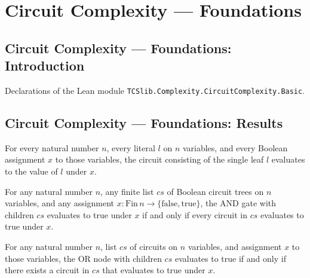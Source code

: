 \section{Circuit Complexity --- Foundations}
\subsection*{Circuit Complexity --- Foundations: Introduction}

Declarations of the Lean module \texttt{TCSlib.Complexity.CircuitComplexity.Basic}.

\subsection*{Circuit Complexity --- Foundations: Results}

\begin{theorem}
\label{BoolCircuit.TreeCircuit.eval_lit}
\leanok
{}
For every natural number $n$, every literal $l$ on $n$ variables, and every Boolean
assignment $x$ to those variables, the circuit consisting of the single leaf $l$
evaluates to the value of $l$ under $x$.
\end{theorem}

\begin{theorem}
\label{BoolCircuit.TreeCircuit.eval_node_true_iff}
\leanok
{}
For any natural number $n$, any finite list $cs$ of Boolean circuit trees on $n$
variables, and any assignment $x : \mathrm{Fin}\,n \to
\{\mathrm{false},\mathrm{true}\}$, the AND gate with children $cs$ evaluates to true
under $x$ if and only if every circuit in $cs$ evaluates to true under $x$.
\end{theorem}

\begin{theorem}
\label{BoolCircuit.TreeCircuit.eval_node_false_iff}
\leanok
{}
For any natural number $n$, list $cs$ of circuits on $n$ variables, and assignment $x$
to those variables, the OR node with children $cs$ evaluates to true if and only if
there exists a circuit in $cs$ that evaluates to true under $x$.
\end{theorem}

